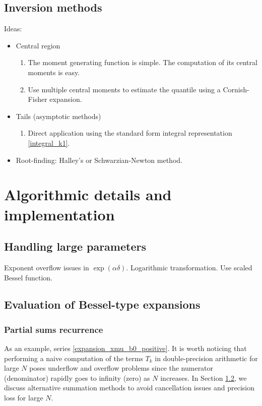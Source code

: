 \documentclass[10pt,a4paper,oneside]{article}
\numberwithin{equation}{section}
\begin{document}
\subsection{Inversion methods}
Ideas:
\begin{itemize}
\item Central region
\begin{enumerate}
\item The moment generating function is simple. The computation of its central moments is easy.
\item Use multiple central moments to estimate the quantile using a Cornish-Fisher expansion.
\end{enumerate}
\item Tails (asymptotic methods) \cite[\S 42]{Temme2015}
\begin{enumerate}
\item Direct application using the standard form integral representation \eqref{integral_k1}.
\end{enumerate}
\item Root-finding: Halley's or Schwarzian-Newton method.
\end{itemize}

\section{Algorithmic details and implementation}
\subsection{Handling large parameters}
Exponent overflow issues in $\exp(\alpha \delta)$. Logarithmic transformation. Use scaled Bessel function.
\subsection{Evaluation of Bessel-type expansions}\label{subsection_evaluation_bessel_expansions}

\subsubsection{Partial sums recurrence}
As an example, series \eqref{expansion_xmu_b0_positive}. It is worth noticing that performing a naive computation of the terms $T_k$ in double-precision arithmetic for large $N$ poses underflow and overflow problems since the numerator (denominator) rapidly goes to infinity (zero) as $N$ increases. In Section \ref{subsection_evaluation_bessel_expansions}, we discuss alternative summation methods to avoid cancellation issues and precision loss for large $N$.
\end{document}
